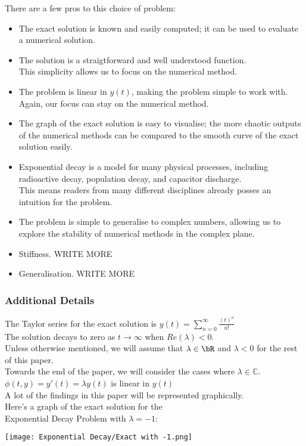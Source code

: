\par There are a few pros to this choice of problem:
\begin{itemize}
    \item The exact solution is known and easily computed; it can be used to evaluate a numerical solution.
    \item The solution is a straigtforward and well understood function.\\
    	  This simplicity allows us to focus on the numerical method.
    \item The problem is linear in $y(t)$, making the problem simple to work with.\\
    	  Again, our focus can stay on the numerical method.
    \item The graph of the exact solution is easy to visualise; the more chaotic outputs of the numerical methods can be compared to the smooth curve of the exact solution easily.
    \item Exponential decay is a model for many physical processes, including radioactive decay, population decay, and capacitor discharge.\\
    	  This means readers from many different disciplines already posses an intuition for the problem.
    \item The problem is simple to generalise to complex numbers, allowing us to explore the stability of numerical methods in the complex plane.
    \item Stiffness. WRITE MORE
    \item Generalisation. WRITE MORE
\end{itemize}

\subsubsection{Additional Details}
\begin{multicols}{2}
The Taylor series for the exact solution is $y(t) = \sum\limits_{n=0}^{\infty} \frac{{(t)}^n}{n!}$\\
The solution decays to zero as $t \rightarrow \infty$ when $Re(\lambda) < 0$.\\

Unless otherwise mentioned, we will assume that $\lambda \in \bR$ and $\lambda < 0$ for the rest of this paper.\\
Towards the end of the paper, we will consider the cases where $\lambda \in \mathbb{C}$.\\

$\phi(t, y) = y'(t) = \lambda y(t)$ is linear in $y(t)$\\

A lot of the findings in this paper will be represented graphically.\\

\columnbreak{}
Here's a graph of the exact solution for the\\ Exponential Decay Problem with $\lambda = -1$:

\texttt{[image: Exponential Decay/Exact with -1.png]}
\end{multicols}

